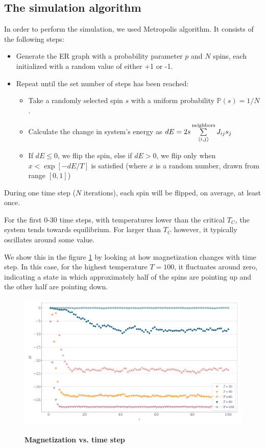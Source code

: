 \documentclass[11pt,a4paper]{article}
\begin{document}
\subsection{The simulation algorithm}

In order to perform the simulation, we used Metropolis algorithm. It consists of the following steps:
\begin{itemize}
\item Generate the ER graph with a probability parameter $p$ and $N$ spins, each initialized with a random value of either +1 or -1.
\item Repeat until the set number of steps has been reached:
    \begin{itemize}
    \item Take a randomly selected spin $s$ with a uniform probability $\mathbb{P}(s)=1/N$.
    \item Calculate the change in system's energy as $dE = 2 s \sum\limits_{\braket{i,j}}^\text{neighbors} J_{ij} s_j$
    \item If $dE\leq0$, we flip the spin, else if $dE>0$, we flip only when $x < \exp[-dE/T]$ is satisfied (where $x$ is a random number, drawn from range $[0,1]$)
    \end{itemize}
\end{itemize}

During one time step ($N$ iterations), each spin will be flipped, on average, at least once.

For the first 0-30 time steps, with temperatures lower than the critical $T_C$, the system tends towards equilibrium. For larger than $T_C$ however, it typically oscillates around some value.

We show this in the figure \ref{fig:mag_vs_time} by looking at how magnetization changes with time step. In this case, for the highest temperature $T=100$, it fluctuates around zero, indicating a state in which approximately half of the spins are pointing up and the other half are pointing down.

\begin{figure}[ht!]
    \centering
    \caption{\textbf{Magnetization vs. time step}}
    \includegraphics[width=\linewidth]{../figures/magnet_vs_steps.pdf}
    \label{fig:mag_vs_time}
\end{figure}
\end{document}
